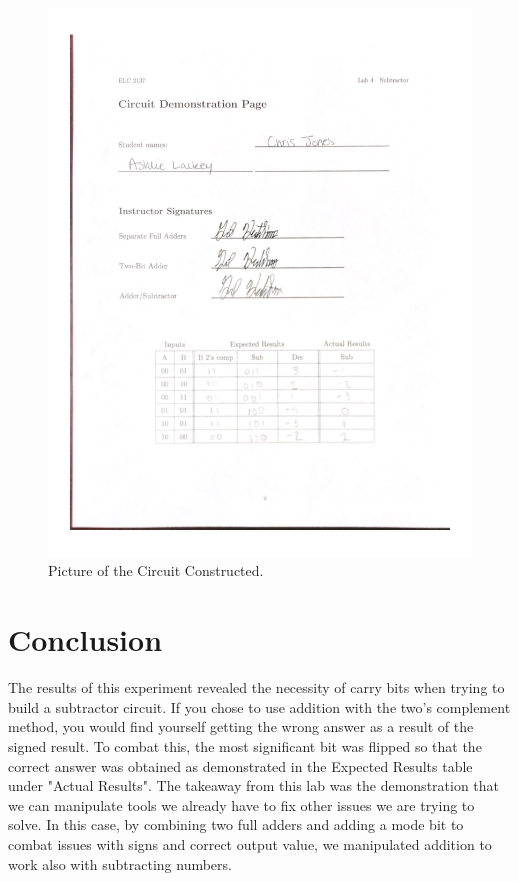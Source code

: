 \documentclass[11pt]{article}
\begin{document}
\begin{figure}
	\includegraphics[width=1.0\textwidth]{"Demonstration"}
	\caption{Picture of the Circuit Constructed.}
\end{figure}

\clearpage
\section*{Conclusion}
The results of this experiment revealed the necessity of carry bits when trying to build a subtractor circuit. If you chose to use addition with the two's complement method, you would find yourself getting the wrong answer as a result of the signed result. To combat this, the most significant bit was flipped so that the correct answer was obtained as demonstrated in the Expected Results table under "Actual Results". The takeaway from this lab was the demonstration that we can manipulate tools we already have to fix other issues we are trying to solve. In this case, by combining two full adders and adding a mode bit to combat issues with signs and correct output value, we manipulated addition to work also with subtracting numbers.
\end{document}
